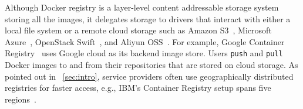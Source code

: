 Although Docker registry is a layer-level content addressable storage system storing all the images,
it delegates storage to drivers that interact with either a local file system or a remote cloud storage such as Amazon S3~\cite{s3}, Microsoft Azure~\cite{azure}, OpenStack Swift~\cite{swift}, and Aliyun OSS~\cite{aliyun}. 
For example, Google Container Registry~\cite{GoogleContainerRegistry} uses Google cloud 
as its backend image store.
Users \texttt{push} and \texttt{pull} Docker images to and from their repositories that are stored on cloud storage. As pointed out in ~\cref{sec:intro}, service providers often use geographically distributed registries for faster access, e.g., IBM's Container Registry setup spans five regions~\cite{dockerworkload}. 

%




